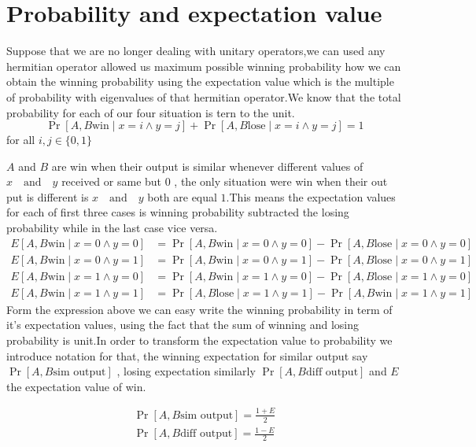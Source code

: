 \section*{Probability  and expectation value}
Suppose that we are no longer dealing with unitary operators,we can used any hermitian operator allowed us maximum possible winning probability how we can obtain the winning probability using the expectation value which is the multiple of probability with  eigenvalues of that  hermitian operator.We know that the total probability for each of our four situation is tern to the unit.
$$\Pr[A,B \text{win} \mid  x=i \wedge y=j]+\Pr[A,B \text{lose}  \mid  x=i \wedge y=j]=1$$ for all $i,j \in \{0,1\}$

$A$ and $B$ are win when their output is similar whenever  different values of $x \quad \text{and} \quad y$ received or same but $0$ , the only situation were win when their out put is different is $x \quad \text{and} \quad y$ both are equal $1$.This means the expectation values for  each of first three  cases is   winning probability subtracted  the losing probability while in the last case vice versa.
\begin{align*}
E[A,B \text{win}  \mid  x=0 \wedge y=0]&=\Pr[A,B \text{win}  \mid  x=0 \wedge y=0]-\Pr[A,B \text{lose}  \mid  x=0 \wedge y=0]\\
E[A,B \text{win}  \mid  x=0 \wedge y=1]&=\Pr[A,B \text{win}  \mid  x=0 \wedge y=1]-\Pr[A,B \text{lose}  \mid  x=0 \wedge y=1]\\
E[A,B \text{win}  \mid  x=1 \wedge y=0]&=\Pr[A,B \text{win}  \mid  x=1 \wedge y=0]-\Pr[A,B \text{lose}  \mid  x=1 \wedge y=0]\\
E[A,B \text{win}  \mid  x=1 \wedge y=1]&=\Pr[A,B \text{lose}  \mid  x=1 \wedge y=1]-\Pr[A,B \text{win}  \mid  x=1 \wedge y=1]
\end{align*}
Form the expression above we can easy write the winning probability in term of it's expectation values, using the fact that the sum of winning and losing probability  is unit.In order to transform the expectation value to probability we introduce notation for that, the winning expectation for similar output say $\Pr[A,B \text{sim output}]$ , losing expectation similarly $\Pr[A,B \text{diff output}]$ and $E$the expectation value of win.

\begin{align*}
\Pr[A,B \text{sim output}]=\frac{1+E}{2}\\
\Pr[A,B \text{diff output}]=\frac{1-E}{2}
\end{align*}


